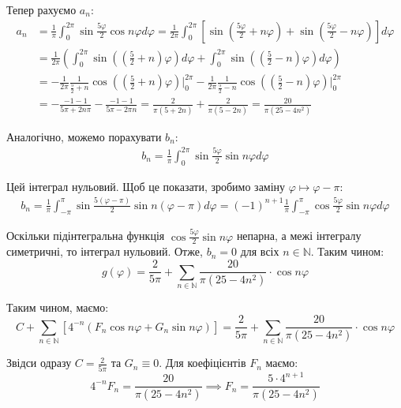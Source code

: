 \documentclass{hw_template}
\begin{document}
Тепер рахуємо $a_n$:
\begin{align*}
    a_n &= \frac{1}{\pi}\int_{0}^{2\pi}\sin\frac{5\varphi}{2}\cos n\varphi d\varphi = \frac{1}{2\pi}\int_0^{2\pi}\left[\sin\left(\frac{5\varphi}{2}+n\varphi\right)+\sin\left(\frac{5\varphi}{2} - n\varphi\right)\right]d\varphi \\
    &= \frac{1}{2\pi}\left(\int_0^{2\pi}\sin\left(\left(\frac{5}{2}+n\right)\varphi\right)d\varphi + \int_0^{2\pi}\sin\left(\left(\frac{5}{2}-n\right)\varphi\right) d\varphi\right) \\
    &= -\frac{1}{2\pi}\frac{1}{\frac{5}{2}+n}\cos\left(\left(\frac{5}{2}+n\right)\varphi\right)\Big|_{0}^{2\pi} - \frac{1}{2\pi}\frac{1}{\frac{5}{2}-n}\cos \left(\left(\frac{5}{2}-n\right)\varphi\right)\Big|_{0}^{2\pi} \\
    &= -\frac{-1-1}{5\pi+2n\pi} - \frac{-1-1}{5\pi - 2\pi n} = \frac{2}{\pi(5+2n)} + \frac{2}{\pi(5-2n)} = \boxed{\frac{20}{\pi(25-4n^2)}}
\end{align*}

Аналогічно, можемо порахувати $b_n$:
\begin{align*}
    b_n = \frac{1}{\pi}\int_{0}^{2\pi}\sin\frac{5\varphi}{2}\sin n\varphi d\varphi
\end{align*}

Цей інтеграл нульовий. Щоб це показати, зробимо заміну $\varphi \mapsto \varphi - \pi$:
\begin{align*}
    b_n = \frac{1}{\pi}\int_{-\pi}^{\pi}\sin\frac{5(\varphi-\pi)}{2}\sin n(\varphi-\pi) d\varphi = (-1)^{n+1}\frac{1}{\pi}\int_{-\pi}^{\pi}\cos\frac{5\varphi}{2}\sin n\varphi d\varphi
\end{align*}

Оскільки підінтегральна функція $\cos\frac{5\varphi}{2}\sin n\varphi$ непарна, а межі інтегралу симетричні, то інтеграл нульовий. Отже, $b_n = 0$ для всіх $n \in \mathbb{N}$. Таким чином:
\begin{equation*}
    g(\varphi) = \frac{2}{5\pi} + \sum_{n \in \mathbb{N}}\frac{20}{\pi(25-4n^2)} \cdot \cos n\varphi
\end{equation*}

Таким чином, маємо:
\begin{equation*}
    C + \sum_{n \in \mathbb{N}} \left[4^{-n}(F_n \cos n\varphi + G_n \sin n\varphi)\right] = \frac{2}{5\pi} + \sum_{n \in \mathbb{N}}\frac{20}{\pi(25-4n^2)} \cdot \cos n\varphi
\end{equation*}

Звідси одразу $C=\frac{2}{5\pi}$ та $G_n \equiv 0$. Для коефіцієнтів $F_n$ маємо:
\begin{equation*}
    4^{-n}F_n = \frac{20}{\pi(25-4n^2)} \implies F_n = \frac{5 \cdot 4^{n+1}}{\pi (25-4n^2)}
\end{equation*}
\end{document}
